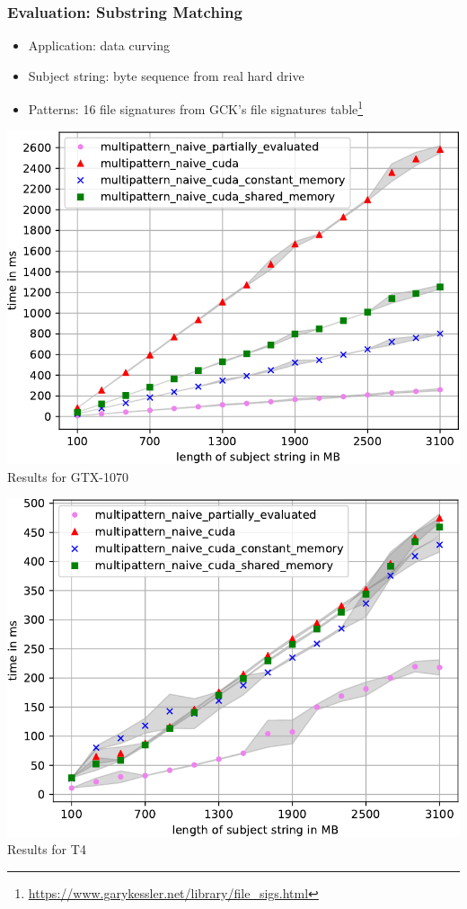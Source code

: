 \documentclass[xcolor=table]{beamer}
\begin{document}
\begin{frame}[fragile] \frametitle{Evaluation: Substring Matching}
  \begin{itemize}
  \item Application: data curving
  \item Subject string: byte sequence from real hard drive
  \item Patterns: 16 file signatures from GCK’s file signatures table\footnote{\url{https://www.garykessler.net/library/file_sigs.html}}
  \end{itemize}
  \begin{center}
  \begin{minipage}[t]{0.48\textwidth}
    \begin{center}
  {\includegraphics[width=\textwidth]{pictures/Substr_1070_crop}}
  \\Results for GTX-1070
\end{center}
\end{minipage}
\begin{minipage}[t]{0.48\textwidth}
  \begin{center}
{\includegraphics[width=\textwidth]{pictures/Substr_T4_crop}}
\\Results for T4
\end{center}
\end{minipage}
\end{center}
\end{frame}
\end{document}
